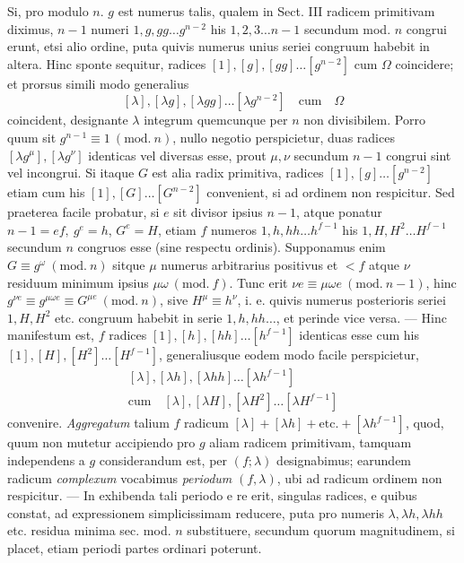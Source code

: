 Si, pro modulo \(n\). \(g\) est numerus talis, qualem in Sect. III radicem primitivam diximus, \(n-1\) numeri \(1,\allowbreak g,\allowbreak gg\ldots g^{n-2}\) his \(1,\allowbreak 2,\allowbreak 3\ldots n-1\) secundum mod. \(n\) congrui erunt, etsi alio ordine, puta quivis numerus unius seriei congruum habebit in altera. Hinc sponte sequitur, radices \([1],\allowbreak [g],\allowbreak [gg]\ldots[g^{n-2}]\) cum \(\Omega\) coincidere; et prorsus simili modo generalius \[[\lambda],[\lambda g],[\lambda gg]\ldots[\lambda g^{n-2}]\quad\text{cum}\quad\Omega\] coincident, designante \(\lambda\) integrum quemcunque per \(n\) non divisibilem. Porro quum sit \(g^{n-1}\equiv1\ (\mathrm{mod.}\ n)\), nullo negotio perspicietur, duas radices \([\lambda g^\mu],\allowbreak [\lambda g^\nu]\) identicas vel diversas esse, prout \(\mu,\allowbreak \nu\) secundum \(n-1\) congrui sint vel incongrui. Si itaque \(G\) est alia radix primitiva, radices \([1],\allowbreak [g]\ldots[g^{n-2}]\) etiam cum his \([1],\allowbreak [G]\ldots[G^{n-2}]\) convenient, si ad ordinem non respicitur. Sed praeterea facile probatur, si \(e\) sit divisor ipsius \(n-1\), atque ponatur \(n-1=ef,\allowbreak \ g^e=h\), \(G^e=H\), etiam \(f\) numeros \(1,\allowbreak h,\allowbreak hh\ldots h^{f-1}\) his \(1,\allowbreak H,\allowbreak H^2\ldots H^{f-1}\) secundum \(n\) congruos esse (sine respectu ordinis). Supponamus enim \(G\equiv g^\omega\ (\mathrm{mod.}\ n)\) sitque \(\mu\) numerus arbitrarius positivus et \(<f\) atque \(\nu\) residuum minimum ipsius \(\mu\omega\ (\mathrm{mod.}\ f)\). Tunc erit \(\nu e\equiv\mu\omega e\ (\mathrm{mod.}\ n-1)\), hinc \(g^{\nu e}\equiv g^{\mu\omega e}\equiv G^{\mu e}\ (\mathrm{mod.}\ n)\), sive \(H^\mu\equiv h^\nu\), i. e. quivis numerus posterioris seriei \(1,\allowbreak H,\allowbreak H^2\) etc. congruum habebit in serie \(1,\allowbreak h,\allowbreak hh\ldots\), et perinde vice versa. — Hinc manifestum est, \(f\) radices \([1],\allowbreak [h],\allowbreak [hh]\ldots[h^{f-1}]\) identicas esse cum his \([1],\allowbreak [H],\allowbreak [H^2]\ldots[H^{f-1}]\), generaliusque eodem modo facile perspicietur, \[\begin{gathered}
[\lambda],[\lambda h],[\lambda hh]\ldots[\lambda h^{f-1}]\\
\text{cum}\quad[\lambda],[\lambda H],[\lambda H^2]\ldots[\lambda H^{f-1}]
\end{gathered}\] convenire. \textit{Aggregatum} talium \(f\) radicum \([\lambda]+[\lambda h]+\mathrm{etc.}+[\lambda h^{f-1}]\), quod, quum
non mutetur accipiendo pro \(g\) aliam radicem primitivam, tamquam independens a \(g\) considerandum est, per \((f;\allowbreak \lambda)\) designabimus; earundem radicum \textit{complexum} vocabimus \textit{periodum} \((f,\allowbreak \lambda)\), ubi ad radicum ordinem non respicitur. — In exhibenda tali periodo e re erit, singulas radices, e quibus constat, ad expressionem simplicissimam reducere, puta pro numeris \(\lambda,\allowbreak \lambda h,\allowbreak \lambda hh\) etc. residua minima sec. mod. \(n\) substituere, secundum quorum magnitudinem, si placet, etiam periodi partes ordinari poterunt.

